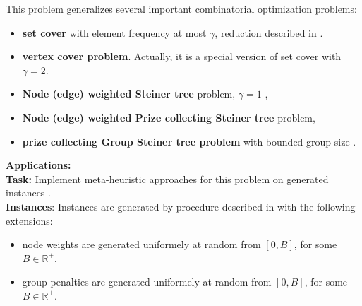 \documentclass[a4paper,11pt]{article}
\begin{document}
This problem generalizes several important combinatorial optimization problems:
\begin{itemize}
    \item \textbf{set cover} with element frequency at most $\gamma$, reduction described in \cite{gargPolylogarithmicApproximationAlgorithm2000}.
    \item \textbf{vertex cover problem}. Actually, it is a special version of set cover with $\gamma = 2$.
    \item \textbf{Node (edge) weighted Steiner tree} problem, $\gamma = 1$  \cite{kleinNearlyBestPossibleApproximation1995},
    \item \textbf{Node (edge) weighted Prize collecting Steiner tree} problem,
    \item \textbf{prize collecting Group Steiner tree problem} with bounded group size \cite{glicksmanApproximationAlgorithmsGroup2008}.
\end{itemize}

\noindent\textbf{Applications:} \cite{faustPathwayDiscoveryMetabolic2010,sunPhysaruminspiredPrizecollectingSteiner2016,zhangPrioritizationCancerDriver2022}\\
\textbf{Task:} Implement meta-heuristic approaches for this problem on generated instances \cite{matijevicGeneralVariableNeighborhood2022}.\\
\textbf{Instances}: Instances are generated by procedure described in \cite{matijevicGeneralVariableNeighborhood2022} with the following extensions:
\begin{itemize}
    \item node weights are generated uniformely at random from $[0,B]$, for some $B\in\mathbb{R}^+$,
    \item group penalties are generated uniformely at random from $[0,B]$, for some $B\in\mathbb{R}^+$.
\end{itemize}



\end{document}
